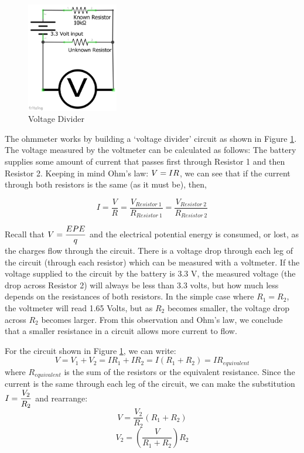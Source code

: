 \documentclass[]{article}
\begin{document}
	\begin{figure}%
		\centering
		\includegraphics[width=4cm]{pics/voltagedivider.png}
		\caption{Voltage Divider}
		\label{divider}
	\end{figure}

	The ohmmeter works by building a `voltage divider' circuit as shown in Figure \ref{divider}.  The voltage measured by the voltmeter can be calculated as follows:  The battery supplies  some amount of current that passes first through Resistor 1 and then Resistor 2.  Keeping in mind Ohm's law: $\displaystyle V=IR$, we can see that if the current through both resistors is the same (as it must be), then,

	\begin{equation}
		I = \frac{V}{R} = \frac{V_{Resistor\ 1}}{R_{Resistor\ 1}} = \frac{V_{Resistor\ 2}}{R_{Resistor\ 2}} 
	\end{equation}

	Recall that $\displaystyle V = \frac{EPE}{q}$ and the electrical potential energy is consumed, or lost, as the charges flow through the circuit.  There is a voltage drop through each leg of the circuit (through each resistor) which can be measured with a voltmeter. If the voltage supplied to the circuit by the battery is 3.3 V, the  measured voltage (the drop across Resistor 2) will always be less than 3.3 volts, but how much less depends on the resistances of both resistors.  In the simple case where $R_1 = R_2$, the voltmeter will read 1.65 Volts, but as $R_2$ becomes smaller, the voltage drop across \(R_2\) becomes larger.  From this observation and Ohm's law, we conclude that a smaller resistance in a circuit allows more current to flow. 

  	For the circuit shown in Figure \ref{divider}, we can write:
	\begin{equation}
		V= V_1 + V_2 = IR_1 + IR_2 = I(R_1 +R_2) = IR_{equivalent}
	\end{equation}
	where $R_{equivalent}$ is the sum of the resistors or the equivalent resistance.  Since the current is the same through each leg of the circuit, we can make the substitution $\displaystyle I = \frac{V_2}{R_2}$ and rearrange:
	\begin{equation}
		V=\frac{V_2}{R_2}(R_1 +R_2)
		\label{voltage}
	\end{equation}
	\begin{equation}
		V_2=\left(\frac{V}{R_1+R_2}\right)R_2
		\label{VDiv}
	\end{equation}
\end{document}
